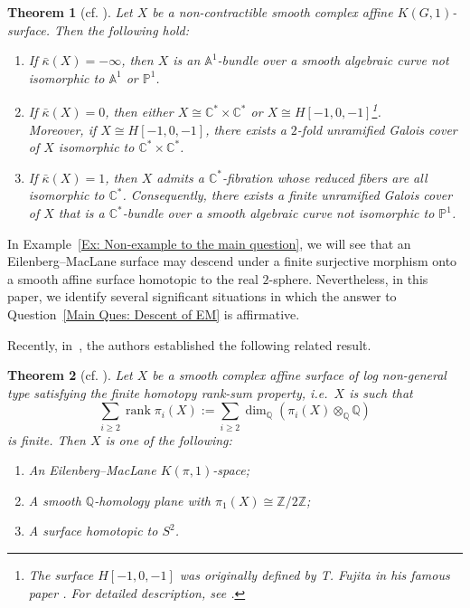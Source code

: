 \documentclass[12pt,reqno,twoside]{amsart}
\newtheorem{theorem}{Theorem}[section]
\theoremstyle{definition}
\numberwithin{equation}{section}
\newcommand{\A}{\mathbb{A}}
\newcommand{\C}{\mathbb{C}}
\newcommand{\Q}{\mathbb{Q}}
\newcommand{\Z}{\mathbb{Z}}
\newcommand{\Kbar}{\bar{\kappa}}
\newcommand{\PP}{\mathbb{P}}
\newcommand{\rank}{\operatorname{rank}}
\begin{document}
\begin{theorem}[cf. {\cite[Result 2.1]{GGH2023}}]\label{Thm: Classification of EM surfaces}
Let $X$ be a non-contractible smooth complex affine $K(G,1)$-surface. Then the following hold:
\begin{enumerate}[\indent\rm(1)]
\item If $\Kbar(X)=-\infty$, then $X$ is an $\A^1$-bundle over a smooth algebraic curve not isomorphic to $\A^1$ or $\PP^1$.
\item If $\Kbar(X)=0$, then either $X\cong \C^*\times \C^*$ or $X \cong H[-1,0,-1]$\footnote{The surface $H[-1,0,-1]$ was originally defined by T. Fujita in his famous paper \cite{Fuj1982}. For detailed description, see \cite{GGH2023}.}.\\Moreover, if $X \cong H[-1,0,-1]$, there exists a $2$-fold unramified Galois cover of $X$ isomorphic to $\C^* \times \C^*$.
\item If $\Kbar(X)=1$, then $X$ admits a $\C^*$-fibration whose reduced fibers are all isomorphic to $\C^*$. Consequently, there exists a finite unramified Galois cover of $X$ that is a $\C^*$-bundle over a smooth algebraic curve not isomorphic to $\PP^1$.
\end{enumerate}
\end{theorem}

In Example~\ref{Ex: Non-example to the main question}, we will see that an Eilenberg--MacLane surface may descend under a finite surjective morphism onto a smooth affine surface homotopic to the real $2$-sphere. Nevertheless, in this paper, we identify several significant situations in which the answer to Question~\ref{Main Ques: Descent of EM} is affirmative.

\medskip

Recently, in~\cite{BH2025}, the authors established the following related result.

\begin{theorem}[cf. {\cite[Theorem G]{BH2025}}]\label{Thm: Classification of affine surfaces with finite homotopy rank-sum}
Let $X$ be a smooth complex affine surface of log non-general type satisfying the finite homotopy rank-sum property, i.e.~$X$ is such that $$\sum_{i\ge 2}\rank\pi_i(X):=\sum_{i\ge 2}\dim_{\Q}\left(\pi_i(X)\otimes_{\Q}\Q\right)$$ is finite. Then $X$ is one of the following:
\begin{enumerate}[\indent\rm(1)]
\item An Eilenberg--MacLane $K(\pi,1)$-space;
\item A smooth $\Q$-homology plane with $\pi_1(X)\cong \Z/2\Z$;
\item A surface homotopic to $S^2$.
\end{enumerate}
\end{theorem}
\end{document}
